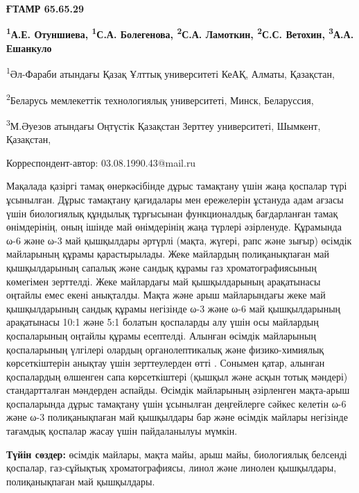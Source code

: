\newpage
{\bfseries ҒТАМР 65.65.29}


\begin{center}
{\bfseries \textsuperscript{1}А.Е. Отуншиева, \textsuperscript{1}С.А. Болегенова, \textsuperscript{2}С.А. Ламоткин, \textsuperscript{2}С.С. Ветохин, \textsuperscript{3}А.А. Ешанкуло}

\textsuperscript{1}Әл-Фараби атындағы Қазақ Ұлттық университеті КеАҚ,
Алматы, Қазақстан,

\textsuperscript{2}Беларусь мемлекеттік технологиялық университеті,
Минск, Беларуссия,

\textsuperscript{3}М.Әуезов атындағы Оңтүстік Қазақстан Зерттеу
университеті, Шымкент, Қазақстан,

Корреспондент-автор: 03.08.1990.43@mail.ru
\end{center}

Мақалада қазіргі тамақ өнеркәсібінде дұрыс тамақтану үшін жаңа қоспалар
түрі ұсынылған. Дұрыс тамақтану қағидалары мен ережелерін ұстануда адам
ағзасы үшін биологиялық құндылық тұрғысынан функционалдық бағдарланған
тамақ өнімдерінің, оның ішінде май өнімдерінің жаңа түрлері әзірленуде.
Құрамында ω-6 және ω-3 май қышқылдары әртүрлі (мақта, жүгері, рапс және
зығыр) өсімдік майларының құрамы қарастырылады. Жеке майлардың
полиқанықпаған май қышқылдарының сапалық және сандық құрамы газ
хроматографиясының көмегімен зерттелді. Жеке майлардағы май
қышқылдарының арақатынасы оңтайлы емес екені анықталды. Мақта және арыш
майларындағы жеке май қышқылдарының сандық құрамы негізінде ω-3 және ω-6
май қышқылдарының арақатынасы 10:1 және 5:1 болатын қоспаларды алу үшін
осы майлардың қоспаларының оңтайлы құрамы есептелді. Алынған өсімдік
майларының қоспаларының үлгілері олардың органолептикалық және
физико-химиялық көрсеткіштерін анықтау үшін зерттеулерден өтті . Сонымен
қатар, алынған қоспалардың өлшенген сапа көрсеткіштері (қышқыл және
асқын тотық мәндері) стандартталған мәндерден аспайды. Өсімдік
майларының әзірленген мақта-арыш қоспаларында дұрыс тамақтану үшін
ұсынылған деңгейлерге сәйкес келетін ω-6 және ω-3 полиқанықпаған май
қышқылдары бар және өсімдік майлары негізінде тағамдық қоспалар жасау
үшін пайдаланылуы мүмкін.

{\bfseries Түйін сөздер:} өсімдік майлары, мақта майы, арыш майы,
биологиялық белсенді қоспалар, газ-сұйықтық хроматографиясы, линол және
линолен қышқылдары, полиқанықпаған май қышқылдары.

